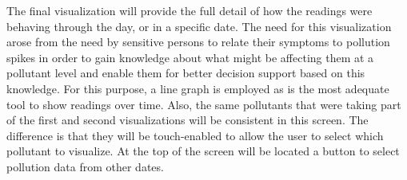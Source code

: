 The final visualization will provide the full detail of how the readings were behaving through the day, or in a specific date. The need for this visualization arose from the need by sensitive persons to relate their symptoms to pollution spikes in order to gain knowledge about what might be affecting them at a pollutant level and enable them for better decision support based on this knowledge. For this purpose, a line graph is employed as is the most adequate tool to show readings over time. Also, the same pollutants that were taking part of the first and second visualizations will be consistent in this screen. The difference is that they will be touch-enabled to allow the user to select which  pollutant to visualize. At the top of the screen will be located a button to select pollution data from other dates. 
